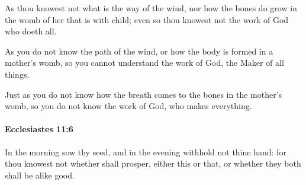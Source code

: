 			\begin{versebox}
					\item[BHS] 
					\item[LXX] 
					\item[ASV] As thou knowest not what is the way of the wind, nor how the bones do grow in the womb of her that is with child; even so thou knowest not the work of God who doeth all.
					\item[NIV] As you do not know the path of the wind, or how the body is formed in a mother’s womb, so you cannot understand the work of God, the Maker of all things.
					\item[NRSV] Just as you do not know how the breath comes to the bones in the mother’s womb, so you do not know the work of God, who makes everything.
			\end{versebox}

		\paragraph{Ecclesiastes 11:6} %
			\label{ECCLESIASTES-11-6}

			In the morning sow thy seed, and in the evening withhold not thine hand: for thou knowest not whether shall prosper, either this or that, or whether they both shall be alike good.

